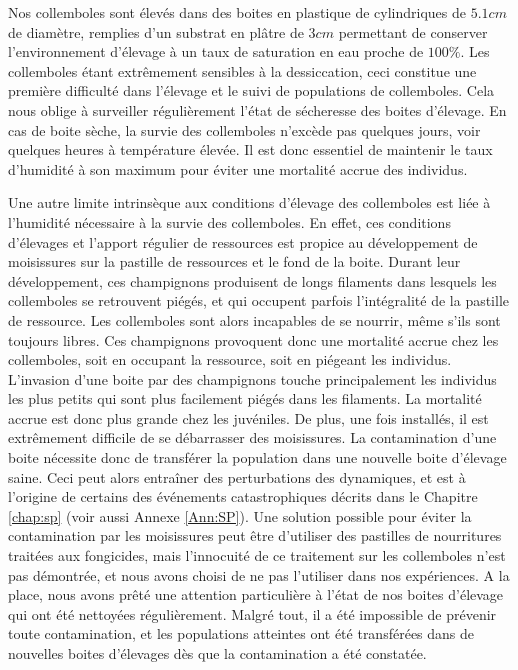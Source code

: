 Nos collemboles sont élevés dans des boites en plastique de cylindriques de
$5.1cm$ de diamètre, remplies d'un substrat en plâtre de $3cm$ permettant de
conserver l'environnement d'élevage à un taux de saturation en eau proche de $100\%$.
Les collemboles étant extrêmement sensibles à la dessiccation, ceci
constitue une première difficulté dans l'élevage et le suivi de populations de
collemboles. Cela nous oblige à surveiller régulièrement l'état de sécheresse
des boites d'élevage. En cas de boite sèche, la survie des collemboles n'excède
pas quelques jours, voir quelques heures à température élevée. Il est donc
essentiel de maintenir le taux d'humidité à son maximum pour éviter une
mortalité accrue des individus.

Une autre limite intrinsèque aux conditions d'élevage des collemboles est liée à
l'humidité nécessaire à la survie des collemboles. En effet, ces conditions
d'élevages et l'apport régulier de ressources est propice au développement de
moisissures sur la pastille de ressources et le fond de la boite. Durant leur
développement, ces champignons produisent de longs filaments dans lesquels les
collemboles se retrouvent piégés, et qui occupent parfois l'intégralité de la
pastille de ressource. Les collemboles sont alors incapables de se nourrir,
même s'ils sont toujours libres. Ces champignons provoquent donc une mortalité
accrue chez les collemboles, soit en occupant la ressource, soit en piégeant les
individus. L'invasion d'une boite par des champignons touche principalement les
individus les plus petits qui sont plus facilement piégés dans les filaments. La
mortalité accrue est donc plus grande chez les juvéniles. De plus, une fois
installés, il est extrêmement difficile de se débarrasser des moisissures. La
contamination d'une boite nécessite donc de transférer la population dans une
nouvelle boite d'élevage saine. Ceci peut alors entraîner des perturbations des
dynamiques, et est à l'origine de certains des événements catastrophiques
décrits dans le Chapitre \ref{chap:sp} (voir aussi Annexe \ref{Ann:SP}). Une
solution possible pour éviter la contamination par les moisissures peut être
d'utiliser des pastilles de nourritures traitées aux fongicides, mais
l'innocuité de ce traitement sur les collemboles n'est pas démontrée, et nous
avons choisi de ne pas l'utiliser dans nos expériences. A la place, nous avons
prêté une attention particulière à l'état de nos boites d'élevage qui ont été
nettoyées régulièrement. Malgré tout, il a été impossible de prévenir toute
contamination, et les populations atteintes ont été transférées dans de
nouvelles boites d'élevages dès que la contamination a été constatée.

